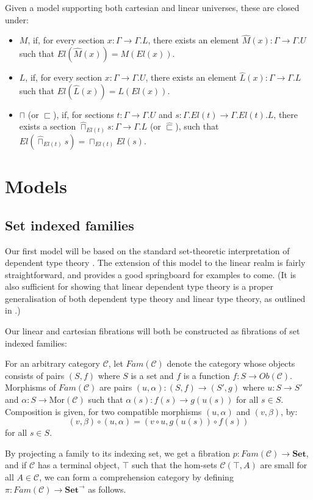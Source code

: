   \begin{defn}
    Given a model supporting both cartesian and linear universes, these are closed under:
    \begin{itemize}
    \item $M$, if, for every section $x : \Gamma \to \Gamma.L$, there exists an element $\hat M(x) : \Gamma \to \Gamma.U$ such that $El(\hat M(x)) = M(El(x))$.
    \item $L$, if, for every section $x : \Gamma \to \Gamma.U$, there exists an element $\hat L(x) : \Gamma \to \Gamma.L$ such that $El(\hat L(x)) = L(El(x))$.
    \item $\sqcap$ (or $\sqsubset$), if, for sections $t : \Gamma \to \Gamma.U$ and $s : \Gamma.El(t) \to \Gamma.El(t).L$, there exists a section $\hat \sqcap_{El(t)}s : \Gamma \to \Gamma.L$ (or $\hat \sqsubset$), such that $El(\hat \sqcap_{El(t)}s) = \sqcap_{El(t)}El(s)$.
    \end{itemize}
\end{defn}


\newpage
\section{Models}
\subsection{Set indexed families}
Our first model will be based on the standard set-theoretic interpretation of dependent type theory \cite{hofmann1997syntax}. The extension of this model to the linear realm is fairly straightforward, and provides a good springboard for examples to come. (It is also sufficient for showing that linear dependent type theory is a proper generalisation of both dependent type theory and linear type theory, as outlined in \cite{vakar14}.)

Our linear and cartesian fibrations will both be constructed as fibrations of set indexed families:
\begin{defn}
For an arbitrary category $\mathcal{C}$, let $Fam(\mathcal{C})$ denote the category whose objects consists of pairs $(S, f)$ where $S$ is a set and $f$ is a function $f : S \to Ob(\mathcal{C})$. Morphisms of $Fam(\mathcal{C})$ are pairs $(u, \alpha) : (S, f) \to (S', g)$ where $u : S \to S'$ and $\alpha : S \to \text{Mor}(\mathcal{C})$ such that $\alpha(s) : f(s) \to g(u(s))$ for all $s \in S$. Composition is given, for two compatible morphisms $(u, \alpha)$ and $(v, \beta)$, by:
\[
(v, \beta) \circ (u, \alpha) = (v \circ u, g(u(s)) \circ f(s))
\]
for all $s \in S$.
\end{defn}
By projecting a family to its indexing set, we get a fibration $p : Fam(\mathcal{C}) \to \mathbf{Set}$, and if $\mathcal{C}$ has a terminal object, $\top$ such that the hom-sets $\mathcal{C}(\top,A)$ are small for all $A \in \mathcal{C}$, we can form a comprehension category by defining $\pi : Fam(\mathcal{C}) \to \mathbf{Set}^\to$ as follows.


